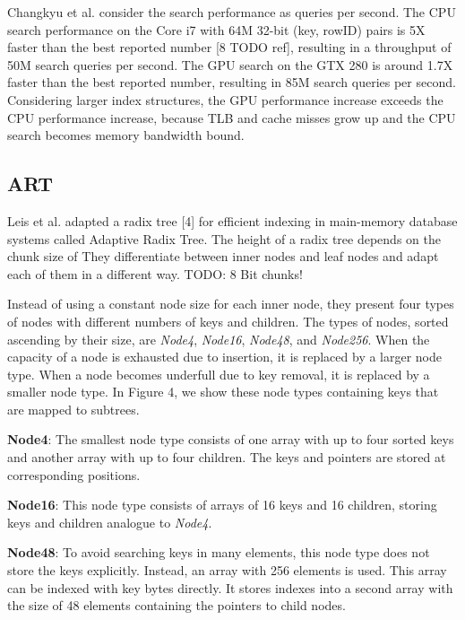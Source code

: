 \documentclass[conference]{IEEEtran}
\begin{document}
Changkyu et al. consider the search performance as queries per second. The CPU search performance on the Core i7 with 64M 32-bit (key, rowID) pairs is 5X faster than the best reported number [8 TODO ref], resulting in a throughput of 50M search queries per second. The GPU search on the GTX 280 is around 1.7X faster than the best reported number, resulting in 85M search queries per second. Considering larger index structures, the GPU performance increase exceeds the CPU performance increase, because TLB and cache misses grow up and the CPU search becomes memory bandwidth bound.


\subsection{ART}\label{SCM}
Leis et al. adapted a radix tree [4] for efficient indexing in main-memory database systems called Adaptive Radix Tree. The height of a radix tree depends on the chunk size of They differentiate between inner nodes and leaf nodes and adapt each of them in a different way. TODO: 8 Bit chunks!

Instead of using a constant node size for each inner node, they present four types of nodes with different numbers of keys and children. The types of nodes, sorted ascending by their size, are \emph{Node4}, \emph{Node16}, \emph{Node48}, and \emph{Node256}. When the capacity of a node is exhausted due to insertion, it is replaced by a larger node type. When a node becomes underfull due to key removal, it is replaced by a smaller node type. In Figure 4, we show these node types containing keys that are mapped to subtrees.

\textbf{Node4}: The smallest node type consists of one array with up to four sorted keys and another array with up to four children. The keys and pointers are stored at corresponding positions.

\textbf{Node16}: This node type consists of arrays of 16 keys and 16 children, storing keys and children analogue to \emph{Node4}.

\textbf{Node48}: To avoid searching keys in many elements, this node type does not store the keys explicitly. Instead, an array with 256 elements is used. This array can be indexed with key bytes directly. It stores indexes into a second array with the size of 48 elements containing the pointers to child nodes.
\end{document}
